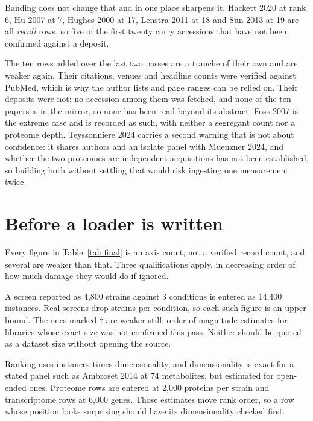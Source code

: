 Banding does not change that and in one place sharpens it. Hackett 2020 at rank 6, Hu 2007
at 7, Hughes 2000 at 17, Lenstra 2011 at 18 and Sun 2013 at 19 are all \emph{recall} rows,
so five of the first twenty carry accessions that have not been confirmed against a deposit.

The ten rows added over the last two passes are a tranche of their own and are weaker
again. Their citations, venues and headline counts were verified against PubMed, which is
why the author lists and page ranges can be relied on. Their deposits were not: no
accession among them was fetched, and none of the ten papers is in the mirror, so none has
been read beyond its abstract. Foss 2007 is the extreme case and is recorded as such, with
neither a segregant count nor a proteome depth. Teyssonniere 2024 carries a second warning
that is not about confidence: it shares authors and an isolate panel with Muenzner 2024,
and whether the two proteomes are independent acquisitions has not been established, so
building both without settling that would risk ingesting one measurement twice.

\section{Before a loader is written}\label{sec:caveats}

Every figure in Table~\ref{tab:final} is an axis count, not a verified record count,
and several are weaker than that. Three qualifications apply, in decreasing order of how
much damage they would do if ignored.

 A screen reported as
4,800 strains against 3 conditions is entered as 14,400 instances. Real screens drop
strains per condition, so each such figure is an upper bound. The ones marked $\ddagger$
are weaker still: order-of-magnitude estimates for libraries whose exact size was not
confirmed this pass. Neither should be quoted as a dataset size without opening the source.

 Ranking
uses instances times dimensionality, and dimensionality is exact for a stated panel such as
Ambroset 2014 at 74 metabolites, but estimated for open-ended ones. Proteome rows are
entered at 2,000 proteins per strain and transcriptome rows at 6,000 genes. Those estimates
move rank order, so a row whose position looks surprising should have its dimensionality
checked first.

